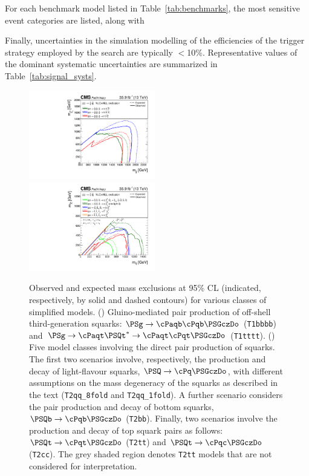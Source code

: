 For each benchmark model listed in Table~\ref{tab:benchmarks}, the
most sensitive event categories are listed, along with 

Finally, uncertainties in the simulation modelling of the efficiencies
of the trigger strategy employed by the search are typically $<$10\%.
Representative values of the dominant systematic uncertainties
are summarized in Table~\ref{tab:signal_systs}. 

\begin{figure}[!t]
  \centering
  \includegraphics[width=0.49\textwidth]{Figures/gluinoSUMMARY.pdf}~
  \includegraphics[width=0.49\textwidth]{Figures/squarkSUMMARY.pdf}\\
  \caption{Observed and expected mass exclusions at 95\% CL
    (indicated, respectively, by solid and dashed contours) for
    various classes of simplified models. (\cmsLeft) Gluino-mediated
    pair production of off-shell third-generation squarks: $\PSg\to
    \cPaqb\cPqb\PSGczDo$ (\texttt{T1bbbb}) and $\PSg\to
    \cPaqt\PSQt^*\to \cPaqt\cPqt\PSGczDo$ (\texttt{T1tttt}).
    (\cmsRight) Five model classes involving the direct pair
    production of squarks. The first two scenarios involve,
    respectively, the production and decay of light-flavour squarks,
    $\PSQ\to \cPq\PSGczDo$, with different assumptions on the mass
    degeneracy of the squarks as described in the text
    (\texttt{T2qq\_8fold} and \texttt{T2qq\_1fold}). A further
    scenario considers the pair production and decay of bottom
    squarks, $\PSQb\to \cPqb\PSGczDo$ (\texttt{T2bb}). Finally, two
    scenarios involve the production and decay of top squark pairs as
    follows: $\PSQt\to \cPqt\PSGczDo$ (\texttt{T2tt}) and $\PSQt\to
    \cPqc\PSGczDo$ (\texttt{T2cc}). The grey shaded region denotes
    \texttt{T2tt} models that are not considered for interpretation.  
  }
  \label{fig:limits} 
\end{figure}

